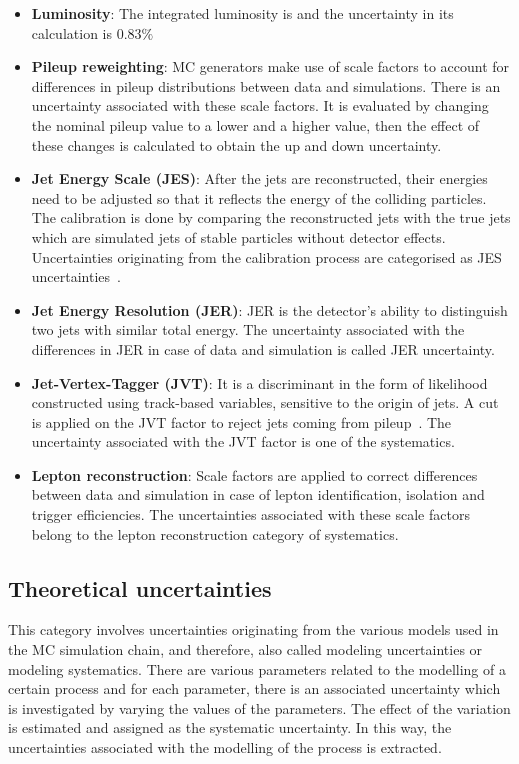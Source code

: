 \begin{itemize}
  \item \textbf{Luminosity}: The integrated luminosity is \lumi and the uncertainty in its calculation
  is $0.83\%$

  \item \textbf{Pileup reweighting}: MC generators make use of scale factors to account for differences in 
  pileup distributions between data and simulations. There is an uncertainty associated with these 
  scale factors. It is evaluated by changing the nominal pileup value to a lower and a higher value,
  then the effect of these changes is calculated to obtain the up and down uncertainty.

  \item \textbf{Jet Energy Scale (JES)}: After the jets are reconstructed, their energies need to be 
  adjusted so that it reflects the energy of the colliding particles. The calibration is done by 
  comparing the reconstructed jets with the true jets which are simulated jets of stable particles 
  without detector effects. Uncertainties originating from the calibration process are categorised 
  as JES uncertainties~\cite{Barillari2012}.

  \item \textbf{Jet Energy Resolution (JER)}: JER is the detector's ability to distinguish two jets 
  with similar total energy. The uncertainty associated with the differences in JER in case of data and 
  simulation is called JER uncertainty. 

  \item \textbf{Jet-Vertex-Tagger (JVT)}: It is a discriminant in the form of likelihood constructed 
  using track-based variables, sensitive to the origin of jets. A cut is applied on the JVT factor to
  reject jets coming from pileup~\cite{ATLAS:2015jhb}. The uncertainty associated with the JVT factor 
  is one of the systematics.

  \item \textbf{Lepton reconstruction}: Scale factors are applied to correct differences between data and
  simulation in case of lepton identification, isolation and trigger efficiencies. The uncertainties
  associated with these scale factors belong to the lepton reconstruction category of systematics.  

\end{itemize}

\subsection{Theoretical uncertainties}
This category involves uncertainties originating from the various models used in the MC simulation 
chain, and therefore, also called modeling uncertainties or modeling systematics. There are various 
parameters related to the modelling of a certain process and for each parameter, there is 
an associated uncertainty which is investigated by varying the values of the parameters. The effect of 
the variation is estimated and assigned as the systematic uncertainty. In this way,
the uncertainties associated with the modelling of the process is extracted. 
  
